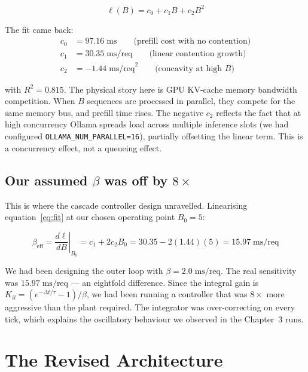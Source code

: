\documentclass[11pt]{article}
\begin{document}
\begin{equation}
    \ell(B) = c_0 + c_1 B + c_2 B^2
    \label{eq:fit}
\end{equation}

The fit came back:
\begin{align*}
    c_0 &= 97.16 \;\text{ms} \qquad \text{(prefill cost with no contention)} \\
    c_1 &= 30.35 \;\text{ms/req} \qquad \text{(linear contention growth)} \\
    c_2 &= -1.44 \;\text{ms/req}^2 \qquad \text{(concavity at high $B$)}
\end{align*}

with $R^2 = 0.815$.  The physical story here is GPU KV-cache memory
bandwidth competition.  When $B$ sequences are processed in parallel, they
compete for the same memory bus, and prefill time rises.  The negative $c_2$
reflects the fact that at high concurrency Ollama spreads load across
multiple inference slots (we had configured
\texttt{OLLAMA\_NUM\_PARALLEL=16}), partially offsetting the linear term.
This is a concurrency effect, not a queueing effect.

\subsection*{Our assumed $\beta$ was off by $8\times$}

This is where the cascade controller design unravelled.  Linearising
equation~\eqref{eq:fit} at our chosen operating point $B_0 = 5$:

\begin{equation}
    \beta_{\mathrm{eff}}
      = \left.\frac{d\ell}{dB}\right|_{B_0}
      = c_1 + 2c_2 B_0
      = 30.35 - 2(1.44)(5)
      = 15.97 \;\text{ms/req}
\end{equation}

We had been designing the outer loop with $\beta = 2.0\;\text{ms/req}$.
The real sensitivity was $15.97\;\text{ms/req}$ --- an eightfold difference.
Since the integral gain is $K_{il} = (e^{-\Delta t/\tau} - 1)/\beta$, we
had been running a controller that was $8\times$ more aggressive than the
plant required.  The integrator was over-correcting on every tick, which
explains the oscillatory behaviour we observed in the Chapter~3 runs.

\section*{The Revised Architecture}
\end{document}
